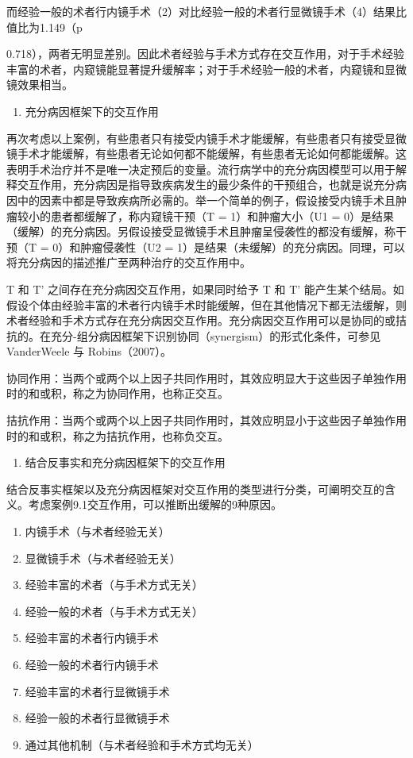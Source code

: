 \documentclass[
  chinese-hans,
  letterpaper,
  DIV=11,
  numbers=noendperiod]{scrreprt}
\providecommand{\tightlist}{%
  \setlength{\itemsep}{0pt}\setlength{\parskip}{0pt}}
\begin{document}
而经验一般的术者行内镜手术（2）对比经验一般的术者行显微镜手术（4）结果比值比为1.149（p

0.718），两者无明显差别。因此术者经验与手术方式存在交互作用，对于手术经验丰富的术者，内窥镜能显著提升缓解率；对于手术经验一般的术者，内窥镜和显微镜效果相当。

\begin{enumerate}
\def\labelenumi{\arabic{enumi}.}
\setcounter{enumi}{1}
\tightlist
\item
  充分病因框架下的交互作用
\end{enumerate}

再次考虑以上案例，有些患者只有接受内镜手术才能缓解，有些患者只有接受显微镜手术才能缓解，有些患者无论如何都不能缓解，有些患者无论如何都能缓解。这表明手术治疗并不是唯一决定预后的变量。流行病学中的充分病因模型可以用于解释交互作用，充分病因是指导致疾病发生的最少条件的干预组合，也就是说充分病因中的因素中都是导致疾病所必需的。举一个简单的例子，假设接受内镜手术且肿瘤较小的患者都缓解了，称内窥镜干预（T
= 1）和肿瘤大小（U1 =
0）是结果（缓解）的充分病因。另假设接受显微镜手术且肿瘤呈侵袭性的都没有缓解，称干预（T
= 0）和肿瘤侵袭性（U2 =
1）是结果（未缓解）的充分病因。同理，可以将充分病因的描述推广至两种治疗的交互作用中。

T 和 T' 之间存在充分病因交互作用，如果同时给予 T 和 T'
能产生某个结局。如假设个体由经验丰富的术者行内镜手术时能缓解，但在其他情况下都无法缓解，则术者经验和手术方式存在充分病因交互作用。充分病因交互作用可以是协同的或拮抗的。在充分-组分病因框架下识别协同（synergism）的形式化条件，可参见
VanderWeele 与 Robins（2007）。

协同作用：当两个或两个以上因子共同作用时，其效应明显大于这些因子单独作用时的和或积，称之为协同作用，也称正交互。

拮抗作用：当两个或两个以上因子共同作用时，其效应明显小于这些因子单独作用时的和或积，称之为拮抗作用，也称负交互。

\begin{enumerate}
\def\labelenumi{\arabic{enumi}.}
\setcounter{enumi}{2}
\tightlist
\item
  结合反事实和充分病因框架下的交互作用
\end{enumerate}

结合反事实框架以及充分病因框架对交互作用的类型进行分类，可阐明交互的含义。考虑案例9.1交互作用，可以推断出缓解的9种原因。

\begin{enumerate}
\def\labelenumi{\arabic{enumi})}
\item
  内镜手术（与术者经验无关）
\item
  显微镜手术（与术者经验无关）
\item
  经验丰富的术者（与手术方式无关）
\item
  经验一般的术者（与手术方式无关）
\item
  经验丰富的术者行内镜手术
\item
  经验一般的术者行内镜手术
\item
  经验丰富的术者行显微镜手术
\item
  经验一般的术者行显微镜手术
\item
  通过其他机制（与术者经验和手术方式均无关）
\end{enumerate}
\end{document}
